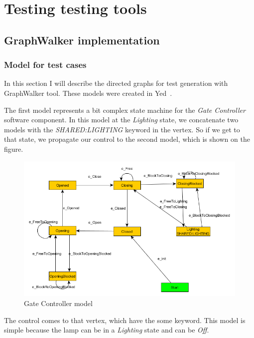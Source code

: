 \chapter{Testing testing tools}\label{sect:GraphWalker implementation of Garage Gate model}

\section{GraphWalker implementation}
\subsection{Model for test cases}

In this section I will describe the directed graphs for test generation with GraphWalker tool. These models were created in Yed~\cite{yEd}.

The first model represents a bit complex state machine for the \textit{Gate Controller} software component. In this model at the \textit{Lighting} state, we concatenate two models with the \textit{SHARED:LIGHTING} keyword in the vertex. So if we get to that state, we propagate our control to the second model, which is shown on the  figure.

\begin{figure}[!ht]
	\centering
	\includegraphics[width=150mm, keepaspectratio]{figures/GateModel.png}
	\caption{Gate Controller model}
	\label{fig:GateModel}
\end{figure}

The control comes to that vertex, which have the some keyword. This model is simple because the lamp can be in a \textit{Lighting} state and can be \textit{Off}.

